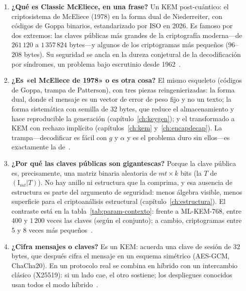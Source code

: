 \documentclass[11pt,a4paper,oneside]{report}
\begin{document}
\begin{enumerate}[leftmargin=1.9em,itemsep=5pt]
  \item \textbf{¿Qué es Classic McEliece, en una frase?} Un KEM
        post-cuántico: el criptosistema de McEliece (1978) en la
        forma dual de Niederreiter, con códigos de Goppa binarios,
        estandarizado por ISO en 2026. Es famoso por dos extremos:
        las claves públicas más grandes de la criptografía
        moderna---de $261\,120$ a $1\,357\,824$ bytes---y algunos de
        los criptogramas más pequeños ($96$--$208$ bytes). Su
        seguridad se ancla en la dureza conjetural de la
        decodificación por síndromes, un problema bajo escrutinio
        desde 1962~\cite{cmspec,cmsecurity}.

  \item \textbf{¿Es «el McEliece de 1978» o es otra cosa?} El mismo
        esqueleto (códigos de Goppa, trampa de Patterson), con tres
        piezas reingenierizadas: la forma dual, donde el mensaje es
        un vector de error de peso fijo y no un texto; la forma
        sistemática con semilla de 32 bytes, que reduce el
        almacenamiento y hace reproducible la generación
        (capítulo~\ref{ch:keygen}); y el transformado a KEM con
        rechazo implícito (capítulos~\ref{ch:kem}
        y~\ref{ch:encapdecap}). La trampa---decodificar es fácil con
        $g$ y $\alpha$ y es el problema duro sin
        ellos---es exactamente la de~\cite{mceliece1978}.

  \item \textbf{¿Por qué las claves públicas son gigantescas?}
        Porque la clave pública es, precisamente, una matriz binaria
        aleatoria de $mt\times k$ bits (la $T$ de
        $(\mathrm{I}_{mt}|T)$). No hay anillo ni estructura que la
        comprima, y esa ausencia de estructura es parte del argumento
        de seguridad: menos álgebra visible, menos superficie para el
        criptoanálisis estructural (capítulo~\ref{ch:estructura}).
        El contraste está en la tabla~\ref{tab:param-contexto}:
        frente a ML-KEM-768, entre $400$ y $1\,200$ veces las claves
        (según el conjunto); a cambio, criptogramas entre $5$ y $8$
        veces más pequeños~\cite{cmsecurity}.

  \item \textbf{¿Cifra mensajes o claves?} Es un KEM: acuerda una
        clave de sesión de $32$ bytes, que después cifra el mensaje
        en un esquema simétrico (AES-GCM, ChaCha20). En un protocolo
        real se combina en híbrido con un intercambio clásico
        (X25519): si un lado cae, el otro sostiene; los despliegues
        conocidos usan todos el modo
        híbrido~\cite{cmimpl,bernstein2026}.


\end{enumerate}
\end{document}
